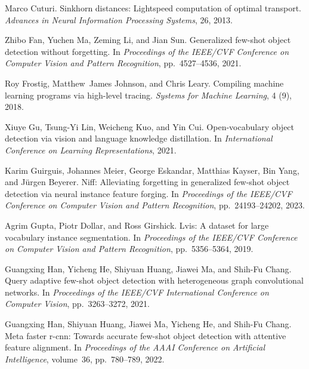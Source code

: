 \begin{thebibliography}{52}
Marco Cuturi.
\newblock Sinkhorn distances: Lightspeed computation of optimal transport.
\newblock \emph{Advances in Neural Information Processing Systems}, 26, 2013.

Zhibo Fan, Yuchen Ma, Zeming Li, and Jian Sun.
\newblock Generalized few-shot object detection without forgetting.
\newblock In \emph{Proceedings of the IEEE/CVF Conference on Computer Vision
  and Pattern Recognition}, pp.\  4527--4536, 2021.

Roy Frostig, Matthew~James Johnson, and Chris Leary.
\newblock Compiling machine learning programs via high-level tracing.
\newblock \emph{Systems for Machine Learning}, 4 (9), 2018.

Xiuye Gu, Tsung-Yi Lin, Weicheng Kuo, and Yin Cui.
\newblock Open-vocabulary object detection via vision and language knowledge
  distillation.
\newblock In \emph{International Conference on Learning Representations}, 2021.

Karim Guirguis, Johannes Meier, George Eskandar, Matthias Kayser, Bin Yang, and
  J{\"u}rgen Beyerer.
\newblock Niff: Alleviating forgetting in generalized few-shot object detection
  via neural instance feature forging.
\newblock In \emph{Proceedings of the IEEE/CVF Conference on Computer Vision
  and Pattern Recognition}, pp.\  24193--24202, 2023.

Agrim Gupta, Piotr Dollar, and Ross Girshick.
\newblock Lvis: A dataset for large vocabulary instance segmentation.
\newblock In \emph{Proceedings of the IEEE/CVF Conference on Computer Vision
  and Pattern Recognition}, pp.\  5356--5364, 2019.

Guangxing Han, Yicheng He, Shiyuan Huang, Jiawei Ma, and Shih-Fu Chang.
\newblock Query adaptive few-shot object detection with heterogeneous graph
  convolutional networks.
\newblock In \emph{Proceedings of the IEEE/CVF International Conference on
  Computer Vision}, pp.\  3263--3272, 2021.

Guangxing Han, Shiyuan Huang, Jiawei Ma, Yicheng He, and Shih-Fu Chang.
\newblock Meta faster r-cnn: Towards accurate few-shot object detection with
  attentive feature alignment.
\newblock In \emph{Proceedings of the AAAI Conference on Artificial
  Intelligence}, volume~36, pp.\  780--789, 2022{}.


\end{thebibliography}
